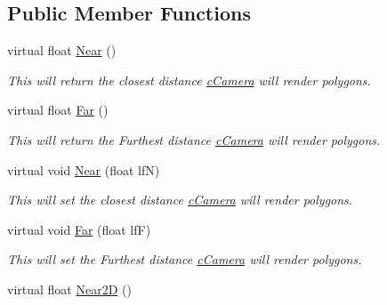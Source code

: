 \subsection*{Public Member Functions}
\begin{DoxyCompactItemize}
\item 
\hypertarget{classc_perspective_control_af4c9bf530c680788925079d1ed64f7db}{
virtual float \hyperlink{classc_perspective_control_af4c9bf530c680788925079d1ed64f7db}{Near} ()}
\label{classc_perspective_control_af4c9bf530c680788925079d1ed64f7db}

\begin{DoxyCompactList}\small\item\em This will return the closest distance \hyperlink{classc_camera}{cCamera} will render polygons. \end{DoxyCompactList}\item 
\hypertarget{classc_perspective_control_aa2a129ba8718923f805335bdb7661f40}{
virtual float \hyperlink{classc_perspective_control_aa2a129ba8718923f805335bdb7661f40}{Far} ()}
\label{classc_perspective_control_aa2a129ba8718923f805335bdb7661f40}

\begin{DoxyCompactList}\small\item\em This will return the Furthest distance \hyperlink{classc_camera}{cCamera} will render polygons. \end{DoxyCompactList}\item 
\hypertarget{classc_perspective_control_ae40f04af303e00f9abdb21ca9a25581d}{
virtual void \hyperlink{classc_perspective_control_ae40f04af303e00f9abdb21ca9a25581d}{Near} (float lfN)}
\label{classc_perspective_control_ae40f04af303e00f9abdb21ca9a25581d}

\begin{DoxyCompactList}\small\item\em This will set the closest distance \hyperlink{classc_camera}{cCamera} will render polygons. \end{DoxyCompactList}\item 
\hypertarget{classc_perspective_control_a5aa44c5690ac0db66157d8c08ecf0a9b}{
virtual void \hyperlink{classc_perspective_control_a5aa44c5690ac0db66157d8c08ecf0a9b}{Far} (float lfF)}
\label{classc_perspective_control_a5aa44c5690ac0db66157d8c08ecf0a9b}

\begin{DoxyCompactList}\small\item\em This will set the Furthest distance \hyperlink{classc_camera}{cCamera} will render polygons. \end{DoxyCompactList}\item 
\hypertarget{classc_perspective_control_af7fffa87f50863a388a5b5b7cc914ce9}{
virtual float \hyperlink{classc_perspective_control_af7fffa87f50863a388a5b5b7cc914ce9}{Near2D} ()}
\label{classc_perspective_control_af7fffa87f50863a388a5b5b7cc914ce9}


\end{DoxyCompactItemize}
